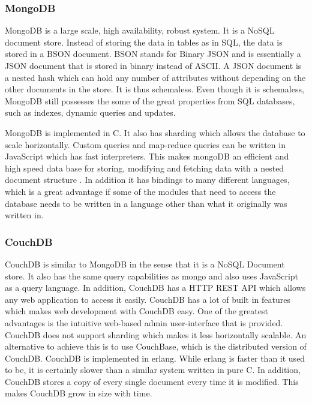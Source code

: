 \subsubsection*{MongoDB}
MongoDB is a large scale, high availability, robust system. It is a NoSQL document store. Instead of storing the data in tables as in SQL, the data is stored in a BSON document. BSON stands for Binary JSON and is essentially a JSON document that is stored in binary instead of ASCII. A JSON document is a nested hash which can hold any number of attributes without depending on the other documents in the store. It is thus schemaless. Even though it is schemaless, MongoDB still possesses the some of the great properties from SQL databases, such as indexes, dynamic queries and updates.

MongoDB is implemented in C. It also has sharding which allows the database to scale horizontally. Custom queries and map-reduce queries can be written in JavaScript which has fast interpreters. This makes mongoDB an efficient and high speed data base for storing, modifying and fetching data with a nested document structure \cite{mongodb-intro}. In addition it has bindings to many different languages, which is a great advantage if some of the modules that need to access the database needs to be written in a language other than what it originally was written in.


\subsubsection*{CouchDB}
CouchDB is similar to MongoDB in the sense that it is a NoSQL Document store. It also has the same query capabilities as mongo and also uses JavaScript as a query language. In addition, CouchDB has a HTTP REST API which allows any web application to access it easily. CouchDB has a lot of built in features which makes web development with CouchDB easy. One of the greatest advantages is the intuitive web-based admin user-interface that is provided.
CouchDB does not support sharding which makes it less horizontally scalable. An alternative to achieve this is to use CouchBase, which is the distributed version of CouchDB. CouchDB is implemented in erlang. While erlang is faster than it used to be, it is certainly slower than a similar system written in pure C. In addition, CouchDB stores a copy of every single document every time it is modified. This makes CouchDB grow in size with time.
\cite{couchdb-about, couchdb-technical}


